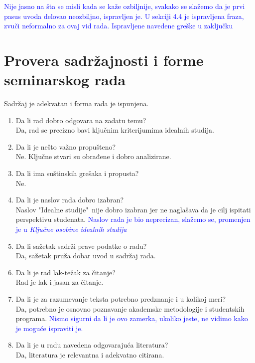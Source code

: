 \documentclass[a4paper]{report}
\newcommand{\odgovor}[1]{\textcolor{blue}{#1}}
\begin{document}
 \odgovor{Nije jasno na šta se misli kada se kaže ozbiljnije, svakako se slažemo da je prvi pasus uvoda delovao neozbiljno, ispravljen je. U sekciji 4.4 je ispravljena fraza, zvuči neformalno za ovaj vid rada. Ispravljene navedene greške u zaključku }
 
 
 \section{Provera sadržajnosti i forme seminarskog rada}
 Sadržaj je adekvatan i forma rada je ispunjena.
 \begin{enumerate}
 \item Da li rad dobro odgovara na zadatu temu?\\
 
 Da, rad se precizno bavi ključnim kriterijumima idealnih studija.
 \item Da li je nešto važno propušteno?\\
 
 Ne. Ključne stvari su obrađene i dobro analizirane.
 \item Da li ima suštinskih grešaka i propusta?\\
 Ne.
 
 \item Da li je naslov rada dobro izabran?\\
 Naslov "Idealne studije"\ nije dobro izabran jer ne naglašava da je cilj ispitati perspektivu studenata.
 \odgovor{Naslov rada je bio neprecizan, slažemo se, promenjen je u \emph{Ključne osobine idealnih studija} }
 
 \item Da li sažetak sadrži prave podatke o radu?\\
 Da, sažetak pruža dobar uvod u sadržaj rada.
 
 \item Da li je rad lak-težak za čitanje?\\
 Rad je lak i jasan za čitanje.
 
 \item Da li je za razumevanje teksta potrebno predznanje i u kolikoj meri?\\
 Da, potrebno je osnovno poznavanje akademske metodologije i studentskih programa.
 \odgovor{Nismo sigurni da li je ovo zamerka, ukoliko jeste, ne vidimo kako je moguće ispraviti je.}
 
 \item Da li je u radu navedena odgovarajuća literatura?\\
 Da, literatura je relevantna i adekvatno citirana.
 

\end{enumerate}
\end{document}
